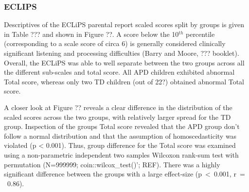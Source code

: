\documentclass[a4paper, twoside]{templates/ociamthesis}
\begin{document}
\hypertarget{eclips}{%
\subsubsection{ECLIPS}\label{eclips}}

Descriptives of the ECLiPS parental report scaled scores split by groups is given in Table ??? and shown in Figure ??. A score below the 10\(^{th}\) percentile (corresponding to a scale score of circa 6) is generally considered clinically significant listening and processing difficulties (Barry and Moore, ??? booklet). Overall, the ECLiPS was able to well separate between the two groups across all the different sub-scales and total score. All APD children exhibited abnormal Total score, whereas only two TD children (out of 22?) obtained abnormal Total score.

A closer look at Figure ?? reveals a clear difference in the distribution of the scaled scores across the two groups, with relatively larger spread for the TD group. Inspection of the groups Total score revealed that the APD group don't follow a normal distribution and that the assumption of homoscedasticity was violated (p \textless{} 0.001). Thus, group difference for the Total score was examined using a non-parametric independent two samples Wilcoxon rank-sum test with permutation (N=999999; coin::wilcox\_test()'; REF). There was a highly significant difference between the groups with a large effect-size (p~\textless~0.001, r~= ~0.86).
\end{document}
